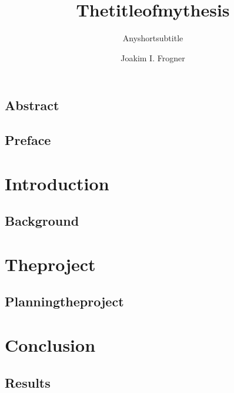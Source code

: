 \documentclass[UKenglish]{ifimaster}
\title{Thetitleofmythesis}
\subtitle{Anyshortsubtitle}
\author{Joakim I. Frogner}
\begin{document}
\duoforside[dept={Department of Informatics},
program={Programming and Networks},
short]

\frontmatter{}
\chapter*{Abstract}

\tableofcontents{}
\listoffigures{}
\listoftables{}

\chapter*{Preface}

\mainmatter{}
\part{Introduction}

\chapter{Background}


\part{Theproject}

\chapter{Planningtheproject}


\part{Conclusion}

\chapter{Results}


\backmatter{}
\printbibliography
\end{document}

